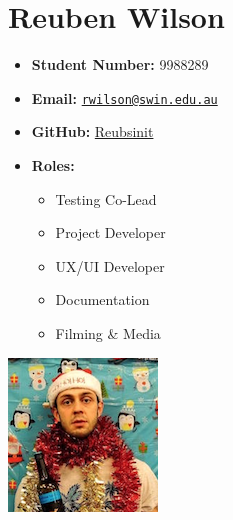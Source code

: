 \documentclass[a4paper]{article}
\providecommand{\tightlist}{%
  \setlength{\itemsep}{0pt}\setlength{\parskip}{0pt}}
\begin{document}
\begin{minipage}{0.7\textwidth}
\section{Reuben Wilson}\label{reuben-wilson}
\begin{itemize}[label={}]
\tightlist
\item
  \textbf{Student Number:} 9988289
\item
  \textbf{Email:}
  \href{mailto:rwilson@swin.edu.au}{\nolinkurl{rwilson@swin.edu.au}}
\item
  \textbf{GitHub:} \href{http://www.github.com/Reubsinit}{Reubsinit}
  \item
    \textbf{Roles:}
    \begin{itemize}
      \item Testing Co-Lead
      \item Project Developer
      \item UX/UI Developer
      \item Documentation
      \item Filming \& Media
    \end{itemize}
\end{itemize}
\end{minipage}%
\begin{minipage}{0.3\textwidth}
\includegraphics{./imgs/reubs.png}
\end{minipage}
\end{document}
